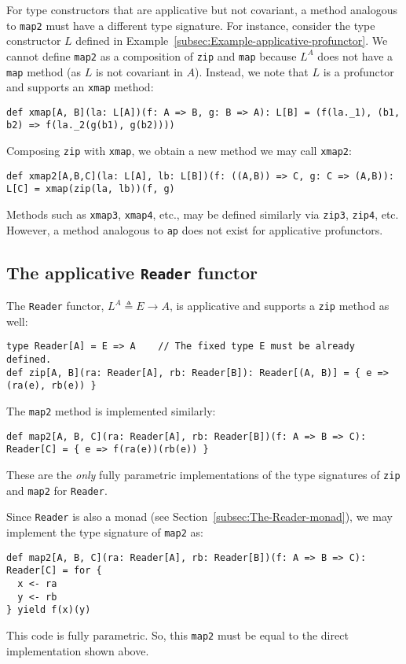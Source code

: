 For type constructors that are applicative but not covariant, a method
analogous to \lstinline!map2! must have a different type signature.
For instance, consider the type constructor $L$ defined in Example~\ref{subsec:Example-applicative-profunctor}.
We cannot define \lstinline!map2! as a composition of \lstinline!zip!
and \lstinline!map! because $L^{A}$ does not have a \lstinline!map!
method (as $L$ is not covariant in $A$). Instead, we note that $L$
is a profunctor and supports an \lstinline!xmap!
method:
\begin{lstlisting}
def xmap[A, B](la: L[A])(f: A => B, g: B => A): L[B] = (f(la._1), (b1, b2) => f(la._2(g(b1), g(b2))))
\end{lstlisting}
Composing \lstinline!zip! with \lstinline!xmap!, we obtain a new
method we may call \lstinline!xmap2!:
\begin{lstlisting}
def xmap2[A,B,C](la: L[A], lb: L[B])(f: ((A,B)) => C, g: C => (A,B)): L[C] = xmap(zip(la, lb))(f, g)
\end{lstlisting}
Methods such as \lstinline!xmap3!, \lstinline!xmap4!, etc., may
be defined similarly via \lstinline!zip3!, \lstinline!zip4!, etc.
However, a method analogous to \lstinline!ap! does not exist for
applicative profunctors.

\subsection{The applicative \texttt{Reader} functor\label{subsec:The-applicative-Reader-functor}}

The \lstinline!Reader! functor, $L^{A}\triangleq E\rightarrow A$,
is applicative and supports a \lstinline!zip! method as well:
\begin{lstlisting}
type Reader[A] = E => A    // The fixed type E must be already defined.
def zip[A, B](ra: Reader[A], rb: Reader[B]): Reader[(A, B)] = { e => (ra(e), rb(e)) }
\end{lstlisting}
The \lstinline!map2! method is implemented similarly:
\begin{lstlisting}
def map2[A, B, C](ra: Reader[A], rb: Reader[B])(f: A => B => C): Reader[C] = { e => f(ra(e))(rb(e)) }
\end{lstlisting}
These are the \emph{only} fully parametric implementations of the
type signatures of \lstinline!zip! and \lstinline!map2! for \lstinline!Reader!.

Since \lstinline!Reader! is also a monad (see Section~\ref{subsec:The-Reader-monad}),
we may implement the type signature of \lstinline!map2! as:
\begin{lstlisting}
def map2[A, B, C](ra: Reader[A], rb: Reader[B])(f: A => B => C): Reader[C] = for {
  x <- ra
  y <- rb
} yield f(x)(y)
\end{lstlisting}
This code is fully parametric. So, this \lstinline!map2! must be
equal to the direct implementation shown above.

